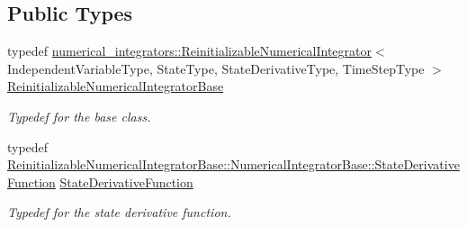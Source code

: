\subsection*{Public Types}
\begin{DoxyCompactItemize}
\item 
typedef \hyperlink{classtudat_1_1numerical__integrators_1_1ReinitializableNumericalIntegrator}{numerical\+\_\+integrators\+::\+Reinitializable\+Numerical\+Integrator}$<$ Independent\+Variable\+Type, State\+Type, State\+Derivative\+Type, Time\+Step\+Type $>$ \hyperlink{classtudat_1_1numerical__integrators_1_1RungeKutta4Integrator_a87be34775c0f99b2b0087aa2f1b438fd}{Reinitializable\+Numerical\+Integrator\+Base}
\begin{DoxyCompactList}\small\item\em Typedef for the base class. \end{DoxyCompactList}\item 
typedef \hyperlink{classtudat_1_1numerical__integrators_1_1NumericalIntegrator_a0d0a5d48ebaf1f5ad9cd7a73b44be0fc}{Reinitializable\+Numerical\+Integrator\+Base\+::\+Numerical\+Integrator\+Base\+::\+State\+Derivative\+Function} \hyperlink{classtudat_1_1numerical__integrators_1_1RungeKutta4Integrator_a53d233a642d328b40ea1ccc0bd218cd1}{State\+Derivative\+Function}
\begin{DoxyCompactList}\small\item\em Typedef for the state derivative function. \end{DoxyCompactList}\end{DoxyCompactItemize}
